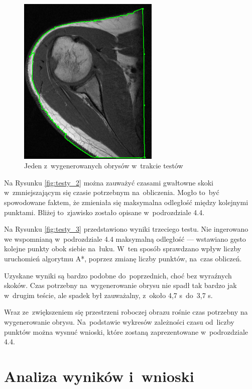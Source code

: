 \documentclass[a4paper,11pt,twoside,openright]{report}
\theoremstyle{definition}
\begin{document}
\begin{figure}[h!]
	\center
	\includegraphics[width=0.6\textwidth]{108}
	\caption{Jeden z~wygenerowanych obrysów w~trakcie testów}
    	\label{fig:108}
\end{figure}


Na Rysunku \ref{fig:testy_2} można zauważyć czasami gwałtowne skoki w~zmniejszającym
się czasie potrzebnym na~obliczenia. Mogło to~być spowodowane faktem, że zmieniała
się maksymalna odległość między kolejnymi punktami. Bliżej to~zjawisko zostało
opisane w~podrozdziale 4.4.

Na Rysunku \ref{fig:testy_3} przedstawiono wyniki trzeciego testu. Nie ingerowano
we wspomnianą w~podrozdziale 4.4 maksymalną odległość --- wstawiano gęsto kolejne
punkty obok siebie na~łuku. W~ten sposób sprawdzano wpływ liczby uruchomień
algorytmu A*, poprzez zmianę liczby punktów, na~czas obliczeń.

Uzyskane wyniki są bardzo podobne do~poprzednich, choć bez wyraźnych skoków.
Czas potrzebny na~wygenerowanie obrysu nie spadł tak bardzo jak w~drugim teście,
ale spadek był zauważalny, z~około 4,7 s~do~3,7 s.

Wraz ze~zwiększeniem się przestrzeni roboczej obrazu rośnie czas potrzebny na
wygenerowanie obrysu. Na~podstawie wykresów zależności czasu od~liczby punktów
można wysnuć wnioski, które zostaną zaprezentowane w~podrozdziale 4.4.

\section {Analiza wyników i~wnioski}
\end{document}
